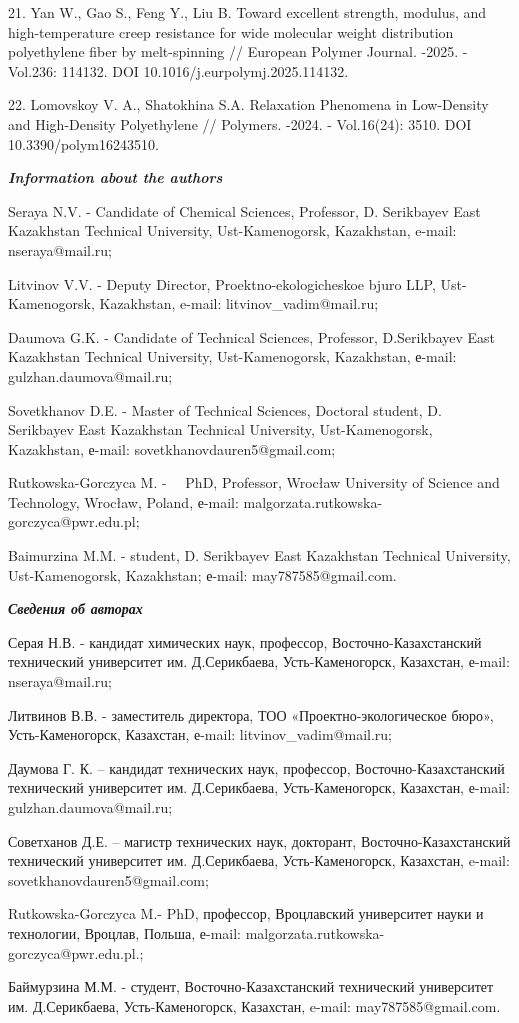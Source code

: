 \begin{refs}
21. Yan W., Gao S., Feng Y., Liu B. Toward excellent strength, modulus,
and high-temperature creep resistance for wide molecular weight
distribution polyethylene fiber by melt-spinning // European Polymer
Journal. -2025. -Vol.236: 114132. DOI 10.1016/j.eurpolymj.2025.114132.

22. Lomovskoy V. A., Shatokhina S.A. Relaxation Phenomena in Low-Density
and High-Density Polyethylene // Polymers. -2024. - Vol.16(24): 3510.
DOI 10.3390/polym16243510.
\end{refs}

\begin{info}
\hspace{1em}\emph{{\bfseries Information about the authors}}

Seraya N.V. - Candidate of Chemical Sciences, Professor, D. Serikbayev
East Kazakhstan Technical University, Ust-Kamenogorsk, Kazakhstan,
e-mail: nseraya@mail.ru;

Litvinov V.V. - Deputy Director, Proektno-ekologicheskoe bjuro LLP,
Ust-Kamenogorsk, Kazakhstan, e-mail: litvinov\_vadim@mail.ru;

Daumova G.K. - Candidate of Technical Sciences, Professor,
D.Serikbayev East Kazakhstan Technical University, Ust-Kamenogorsk,
Kazakhstan, е-mail: gulzhan.daumova@mail.ru;

Sovetkhanov D.E. - Master of Technical Sciences, Doctoral student, D.
Serikbayev East Kazakhstan Technical University, Ust-Kamenogorsk,
Kazakhstan, е-mail: sovetkhanovdauren5@gmail.com;

Rutkowska-Gorczyca M. - ~~PhD, Professor, Wrocław University of
Science and Technology, Wrocław, Poland, е-mail:
malgorzata.rutkowska-gorczyca@pwr.edu.pl;

Baimurzina M.M. - student, D. Serikbayev East Kazakhstan Technical
University, Ust-Kamenogorsk, Kazakhstan; е-mail: may787585@gmail.com.

\hspace{1em}\emph{{\bfseries Сведения об авторах}}

Серая Н.В. - кандидат химических наук, профессор,
Восточно-Казахстанский технический университет им. Д.Серикбаева,
Усть-Каменогорск, Казахстан, е-mail: nseraya@mail.ru;

Литвинов В.В. - заместитель директора, ТОО «Проектно-экологическое
бюро», Усть-Каменогорск, Казахстан, е-mail: litvinov\_vadim@mail.ru;

Даумова Г. К. -- кандидат технических наук, профессор,
Восточно-Казахстанский технический университет им. Д.Серикбаева,
Усть-Каменогорск, Казахстан, е-mail: gulzhan.daumova@mail.ru;

Советханов Д.Е. -- магистр технических наук, докторант,
Восточно-Казахстанский технический университет им. Д.Серикбаева,
Усть-Каменогорск, Казахстан, e-mail: sovetkhanovdauren5@gmail.com;

Rutkowska-Gorczyca M.- PhD, профессор, Вроцлавский университет науки и
технологии, Вроцлав, Польша, е-mail:
malgorzata.rutkowska-gorczyca@pwr.edu.pl.;

Баймурзина М.М. - студент, Восточно-Казахстанский технический
университет им. Д.Серикбаева, Усть-Каменогорск, Казахстан, e-mail:
may787585@gmail.com.
\end{info}
